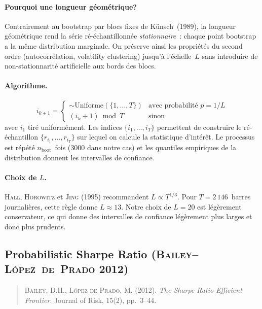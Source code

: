 \paragraph{Pourquoi une longueur géométrique?} Contrairement au bootstrap par blocs fixes de Künsch~(1989), la longueur géométrique rend la série ré-échantillonnée \emph{stationnaire}~: chaque point bootstrap a la même distribution marginale. On préserve ainsi les propriétés du second ordre (autocorrélation, volatility clustering) jusqu'à l'échelle~$L$ sans introduire de non-stationnarité artificielle aux bords des blocs.

\paragraph{Algorithme.}
\begin{equation}
i_{k+1} = \begin{cases}
\sim \text{Uniforme}(\{1, \ldots, T\}) & \text{avec probabilité } p = 1/L \\
(i_{k} + 1) \bmod T & \text{sinon}
\end{cases}
\label{eq:stationary_bootstrap_recurrence}
\end{equation}
avec $i_{1}$ tiré uniformément. Les indices $\{i_{1}, \ldots, i_{T}\}$ permettent de construire le ré-échantillon $\{r_{i_{1}}, \ldots, r_{i_{T}}\}$ sur lequel on calcule la statistique d'intérêt. Le processus est répété $n_{\text{boot}}$~fois (3000 dans notre cas) et les quantiles empiriques de la distribution donnent les intervalles de confiance.

\paragraph{Choix de $L$.} \textsc{Hall}, \textsc{Horowitz} et \textsc{Jing} (1995) recommandent $L \propto T^{1/3}$. Pour $T = 2\,146$~barres journalières, cette règle donne $L \approx 13$. Notre choix de $L = 20$ est légèrement conservateur, ce qui donne des intervalles de confiance légèrement plus larges et donc plus prudents.

\subsection{Probabilistic Sharpe Ratio (\textsc{Bailey--L\'opez~de~Prado} 2012)}
\label{app:psr}

\begin{quote}\small
\textsc{Bailey}, D.H., \textsc{L\'opez de Prado}, M. (2012). \emph{The Sharpe Ratio Efficient Frontier}. Journal of Risk, 15(2), pp.~3--44.
\end{quote}

